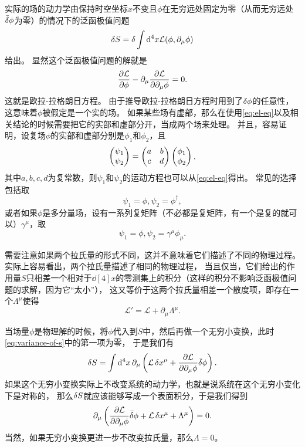\documentclass[hyperref, UTF8, a4paper]{ctexart}
\begin{document}
实际的场的动力学由保持时空坐标$x$不变且$\phi$在无穷远处固定为零（从而无穷远处$\bar{\var}{\phi}$为零）的情况下的泛函极值问题
\begin{equation}
    \var{S} = \var{\int \dd[4]x \mathcal{L}(\phi, \partial_\mu \phi)}
    \label{eq:min-action}
\end{equation}
给出。
显然这个泛函极值问题的解就是
\begin{equation}
    \pdv{\mathcal{L}}{\phi} - \partial_\mu \pdv{\mathcal{L}}{\partial_\mu \phi} = 0.
    \label{eq:el-eq}
\end{equation}
这就是欧拉-拉格朗日方程。
由于推导欧拉-拉格朗日方程时用到了$\var{\phi}$的任意性，这意味着$\phi$被假定是一个实的场。
如果某些场有虚部，那么在使用\eqref{eq:el-eq}以及相关结论的时候需要把它的实部和虚部分开，当成两个场来处理。
并且，容易证明，设复场$\phi$的实部和虚部分别是$\phi_1$和$\phi_2$，且
\[
    \pmqty{\psi_1 \\ \psi_2} = \pmqty{a & b \\ c & d} \pmqty{\phi_1 \\ \phi_2},
\]
其中$a,b,c,d$为复常数，则$\psi_1$和$\psi_2$的运动方程也可以从\eqref{eq:el-eq}得出。
常见的选择包括取
\[
    \psi_1 = \phi, \psi_2 = \phi^\dagger,
\]
或者如果$\phi$是多分量场，设有一系列复矩阵（不必都是复矩阵，有一个是复的就可以）$\gamma^\mu$，取
\[
    \psi_1 = \phi, \psi_2 = \gamma^\mu \phi_\mu.
\]

需要注意如果两个拉氏量的形式不同，这并不意味着它们描述了不同的物理过程。
实际上容易看出，两个拉氏量描述了相同的物理过程，
当且仅当，它们给出的作用量$S$只相差一个相对于$\dd[4]{x}$的零测集上的积分（这样的积分不影响泛函极值问题的求解，因为它“太小”），
这又等价于这两个拉氏量相差一个散度项，即存在一个$\Lambda^\mu$使得
\begin{equation}
\mathcal{L}' = \mathcal{L} + \partial_\mu \Lambda^\mu.
\end{equation}

当场量$\phi$是物理解的时候，将$\phi$代入到$S$中，然后再做一个无穷小变换，此时\eqref{eq:variance-of-s}中的第一项为零，
于是我们有
\[
    \var{S} = \int \dd[4]{x} \partial_\mu \left( \mathcal{L} \var{x}^\mu + \pdv{\mathcal{L}}{\partial_\mu \phi} \bar{\var}\phi \right).
\]
如果这个无穷小变换实际上不改变系统的动力学，也就是说系统在这个无穷小变化下是对称的，
那么$\var{S}$就应该能够写成一个表面积分，于是我们得到
\begin{equation}
    \partial_\mu \left(\pdv{\mathcal{L}}{\partial_\mu \phi} \bar{\var}\phi + \mathcal{L} \var{x^\mu} + \Lambda^\mu\right) = 0.
    \label{eq:noether}
\end{equation}
当然，如果无穷小变换更进一步不改变拉氏量，那么$\Lambda=0$。
\end{document}

